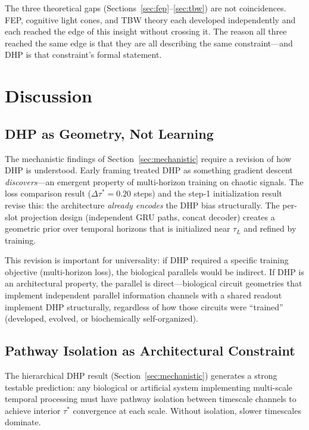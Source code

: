 \documentclass[12pt]{article}
\begin{document}
The three theoretical gaps (Sections~\ref{sec:fep}--\ref{sec:tbw}) are not coincidences.
FEP, cognitive light cones, and TBW theory each developed independently and each reached
the edge of this insight without crossing it. The reason all three reached the same edge
is that they are all describing the same constraint---and DHP is that constraint's formal
statement.

\section{Discussion}
\label{sec:discussion}

\subsection{DHP as Geometry, Not Learning}

The mechanistic findings of Section~\ref{sec:mechanistic} require a revision of how DHP is
understood. Early framing treated DHP as something gradient descent \emph{discovers}---an
emergent property of multi-horizon training on chaotic signals. The loss comparison result
($\Delta\tau^* = 0.20$ steps) and the step-1 initialization result revise this: the
architecture \emph{already encodes} the DHP bias structurally. The per-slot projection
design (independent GRU paths, concat decoder) creates a geometric prior over temporal
horizons that is initialized near $\tau_L$ and refined by training.

This revision is important for universality: if DHP required a specific training objective
(multi-horizon loss), the biological parallels would be indirect. If DHP is an architectural
property, the parallel is direct---biological circuit geometries that implement independent
parallel information channels with a shared readout implement DHP structurally, regardless
of how those circuits were ``trained'' (developed, evolved, or biochemically self-organized).

\subsection{Pathway Isolation as Architectural Constraint}

The hierarchical DHP result (Section~\ref{sec:mechanistic}) generates a strong testable
prediction: any biological or artificial system implementing multi-scale temporal processing
must have pathway isolation between timescale channels to achieve interior $\tau^*$
convergence at each scale. Without isolation, slower timescales dominate.
\end{document}
